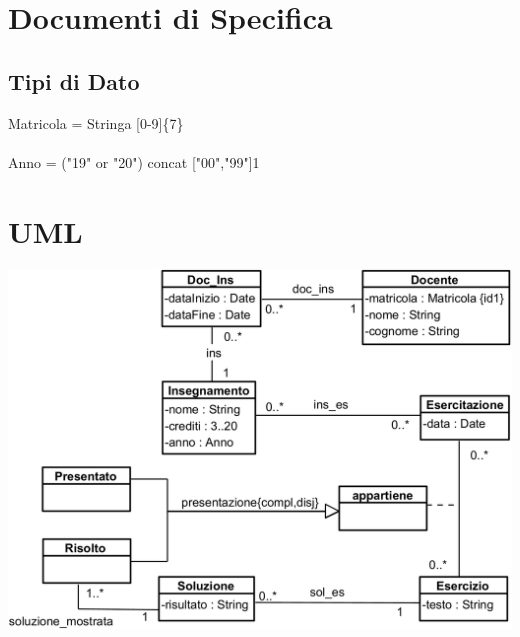 \documentclass[12pt, letterpaper]{article}
\newcommand{\acc}{\\\hphantom{}\\}
\begin{document}
\section{Documenti di Specifica}
\subsection{Tipi di Dato}
Matricola = Stringa [0-9]\{7\}\acc 
Anno = ("19" or "20") concat ["00","99"]{1}
\section{UML}
\begin{center}
    \includegraphics[width=\textwidth]{images/UML.png}
\end{center}
\end{document}
